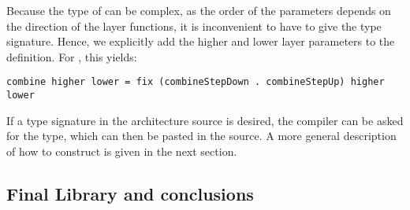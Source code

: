 Because the type of  can be complex, as the order of the parameters depends on the direction of the layer functions, it is inconvenient to have to give the type signature. Hence, we explicitly add the  higher and lower layer parameters to the definition. For , this yields: 

\begin{small}
\begin{verbatim}
combine higher lower = fix (combineStepDown . combineStepUp) higher lower
\end{verbatim}
\end{small}

If a type signature in the architecture source is desired, the compiler can be asked for the type, which can then be pasted in the source. A more general description of how to construct  is given in the next section.

%																
\subsection{Final Library and conclusions} \label{sect:libAndConclusions}

